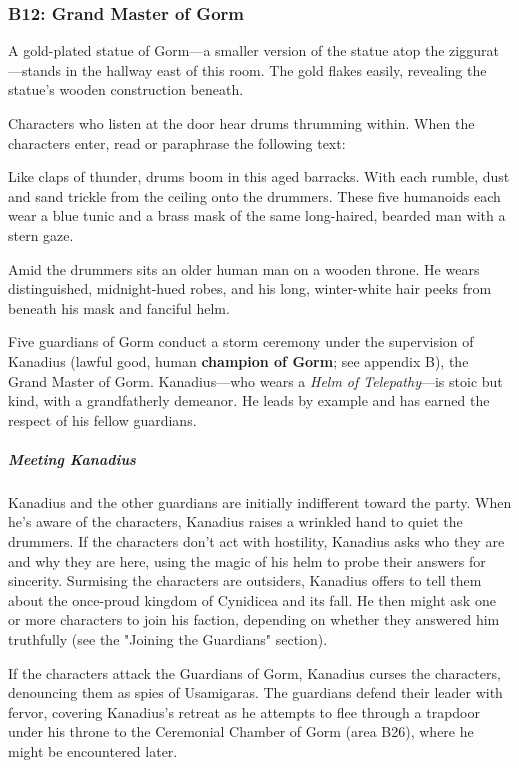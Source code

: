 \documentclass[10pt,a4paper,twoside,bg=print,twocolumn,openany,nodeprecatedcode]{dndbook}
\begin{document}
\subsubsection{B12: Grand Master of Gorm}
A gold-plated statue of Gorm—a smaller version of the statue atop the ziggurat—stands in the hallway east of this room. The gold flakes easily, revealing the statue's wooden construction beneath.

Characters who listen at the door hear drums thrumming within. When the characters enter, read or paraphrase the following text:

\begin{DndReadAloud}{}
Like claps of thunder, drums boom in this aged barracks. With each rumble, dust and sand trickle from the ceiling onto the drummers. These five humanoids each wear a blue tunic and a brass mask of the same long-haired, bearded man with a stern gaze.

Amid the drummers sits an older human man on a wooden throne. He wears distinguished, midnight-hued robes, and his long, winter-white hair peeks from beneath his mask and fanciful helm.

\end{DndReadAloud}

Five guardians of Gorm conduct a storm ceremony under the supervision of Kanadius (lawful good, human \textbf{champion of Gorm}; see appendix B), the Grand Master of Gorm. Kanadius—who wears a \textit{Helm of Telepathy}—is stoic but kind, with a grandfatherly demeanor. He leads by example and has earned the respect of his fellow guardians.

\subparagraph{Meeting Kanadius}
Kanadius and the other guardians are initially indifferent toward the party. When he's aware of the characters, Kanadius raises a wrinkled hand to quiet the drummers. If the characters don't act with hostility, Kanadius asks who they are and why they are here, using the magic of his helm to probe their answers for sincerity. Surmising the characters are outsiders, Kanadius offers to tell them about the once-proud kingdom of Cynidicea and its fall. He then might ask one or more characters to join his faction, depending on whether they answered him truthfully (see the "Joining the Guardians" section).

If the characters attack the Guardians of Gorm, Kanadius curses the characters, denouncing them as spies of Usamigaras. The guardians defend their leader with fervor, covering Kanadius's retreat as he attempts to flee through a trapdoor under his throne to the Ceremonial Chamber of Gorm (area B26), where he might be encountered later.
\end{document}
